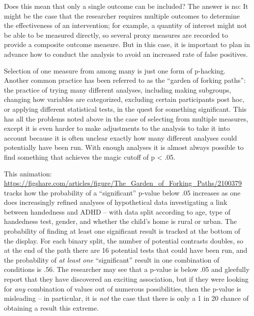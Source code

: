 \documentclass{krantz}
\begin{document}
Does this mean that only a single outcome can be included? The answer is no: It might be the case that the researcher requires multiple outcomes to determine the effectiveness of an intervention; for example, a quantity of interest might not be able to be measured directly, so several proxy measures are recorded to provide a composite outcome measure. But in this case, it is important to plan in advance how to conduct the analysis to avoid an increased rate of false positives.

Selection of one measure from among many is just one form of p-hacking. Another common practice has been referred to as the ``garden of forking paths'': the practice of trying many different analyses, including making subgroups, changing how variables are categorized, excluding certain participants post hoc, or applying different statistical tests, in the quest for something significant. This has all the problems noted above in the case of selecting from multiple measures, except it is even harder to make adjustments to the analysis to take it into account because it is often unclear exactly how many different analyses could potentially have been run. With enough analyses it is almost always possible to find something that achieves the magic cutoff of p \textless{} .05.

This animation:  \\
\href{https://figshare.com/articles/figure/The_Garden_of_Forking_Paths/2100379}{
https://figshare.com/articles/figure/The\_Garden\_of\_Forking\_Paths/2100379} \\
tracks how the probability of a ``significant'' p-value below .05 increases as one does increasingly refined analyses of hypothetical data investigating a link between handedness and ADHD -- with data split according to age, type of handedness test, gender, and whether the child's home is rural or urban. The probability of finding at least one significant result is tracked at the bottom of the display. For each binary split, the number of potential contrasts doubles, so at the end of the path there are 16 potential tests that could have been run, and the probability of \emph{at least one} ``significant'' result in one combination of conditions is .56. The researcher may see that a p-value is below .05 and gleefully report that they have discovered an exciting association, but if they were looking for \emph{any} combination of values out of numerous possibilities, then the p-value is misleading -- in particular, it is \emph{not} the case that there is only a 1 in 20 chance of obtaining a result this extreme.
\end{document}
